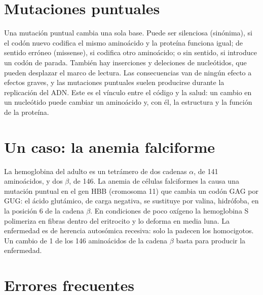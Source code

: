 \documentclass{book}
\begin{document}

\section{Mutaciones puntuales}

Una mutación puntual cambia una sola base. Puede ser silenciosa (sinónima), si el codón nuevo codifica el mismo aminoácido y la proteína funciona igual; de sentido erróneo (missense), si codifica otro aminoácido; o sin sentido, si introduce un codón de parada. También hay inserciones y deleciones de nucleótidos, que pueden desplazar el marco de lectura. Las consecuencias van de ningún efecto a efectos graves, y las mutaciones puntuales suelen producirse durante la replicación del ADN. Este es el vínculo entre el código y la salud: un cambio en un nucleótido puede cambiar un aminoácido y, con él, la estructura y la función de la proteína.


\section{Un caso: la anemia falciforme}

La hemoglobina del adulto es un tetrámero de dos cadenas \(\alpha\), de 141 aminoácidos, y dos \(\beta\), de 146. La anemia de células falciformes la causa una mutación puntual en el gen HBB (cromosoma 11) que cambia un codón GAG por GUG: el ácido glutámico, de carga negativa, se sustituye por valina, hidrófoba, en la posición 6 de la cadena \(\beta\). En condiciones de poco oxígeno la hemoglobina S polimeriza en fibras dentro del eritrocito y lo deforma en media luna. La enfermedad es de herencia autosómica recesiva: solo la padecen los homocigotos. Un cambio de 1 de los 146 aminoácidos de la cadena \(\beta\) basta para producir la enfermedad.


\section{Errores frecuentes}
\end{document}
